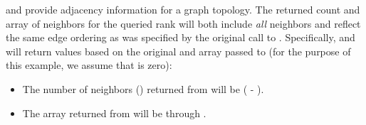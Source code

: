 \begin{sloppy}
 and  provide  
adjacency information for a graph topology.  
The returned count and array of neighbors for the queried rank will 
both include \emph{all} neighbors and reflect the same edge ordering as 
was specified by the original call to . 
Specifically,  and 
 will return values based on the original 
 and  array passed to 
(for the purpose of this example, we assume that  is zero):

\end{sloppy}
\begin{itemize} 
\item The number of neighbors () returned from\flushline %
   will be ( - 
  ). 
\item The  array returned from 
   will be {\gb\mbox{}}
  through {\gb\mbox{}}.
\end{itemize} 
 
